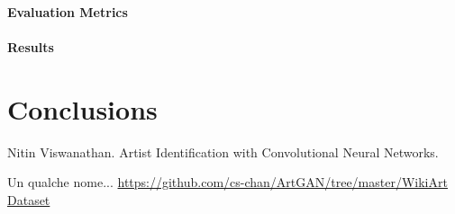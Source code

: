 \documentclass{article}
\begin{document}
\paragraph{Evaluation Metrics}

\paragraph{Results}




\section{Conclusions}\label{conclusions}

\begin{thebibliography}{1}
	
	Nitin Viswanathan.
	\newblock Artist Identification with Convolutional Neural Networks. 
	
	Un qualche nome... \newblock
	\url{https://github.com/cs-chan/ArtGAN/tree/master/WikiArt Dataset}
	
\end{thebibliography}
\end{document}
